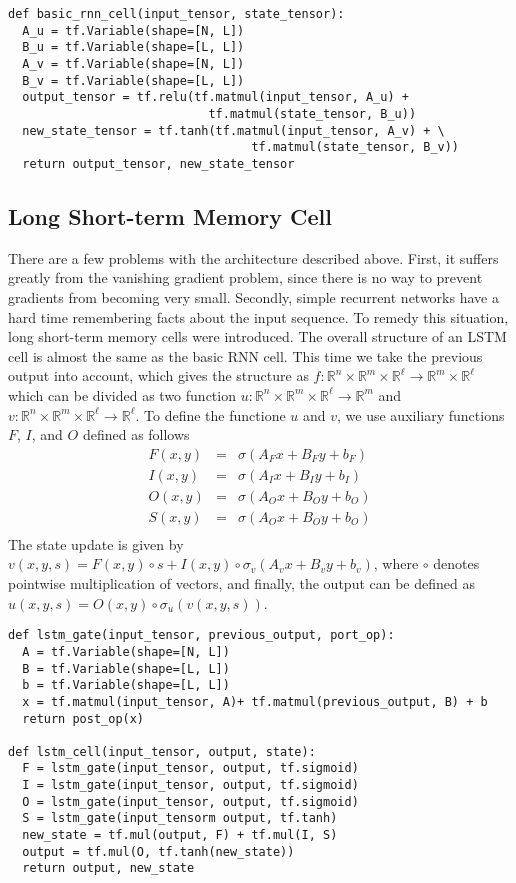\documentclass[10pt]{amsart}
\newcommand{\R}{\mathbb{R}}
\theoremstyle{definition}
\begin{document}
\begin{verbatim}
def basic_rnn_cell(input_tensor, state_tensor):
  A_u = tf.Variable(shape=[N, L])
  B_u = tf.Variable(shape=[L, L])
  A_v = tf.Variable(shape=[N, L])
  B_v = tf.Variable(shape=[L, L])
  output_tensor = tf.relu(tf.matmul(input_tensor, A_u) +
                            tf.matmul(state_tensor, B_u))
  new_state_tensor = tf.tanh(tf.matmul(input_tensor, A_v) + \
                                  tf.matmul(state_tensor, B_v))
  return output_tensor, new_state_tensor
\end{verbatim}


\subsection{Long Short-term Memory Cell} There are a few problems with the architecture described above.  First, it suffers greatly from the vanishing gradient problem, since there is no way to prevent gradients from becoming very small.  Secondly, simple recurrent networks have a hard time remembering facts about the input sequence.  To remedy this situation, long short-term memory cells were introduced.  The overall structure of an LSTM cell is almost the same as the basic RNN cell. This time we take the previous output into account, which gives the structure as $f:\R^n\times \R^m\times \R^{\ell}\to \R^m\times \R^{\ell}$ which can be divided as two function $u:\R^{n}\times\R^m\times \R^{\ell}\to \R^m$ and $v:\R^n\times \R^m\times\R^{\ell}\to \R^{\ell}$. To define the functione $u$ and $v$, we use auxiliary functions $F$, $I$, and $O$ defined as follows
\begin{eqnarray*}
  F(x, y) &=& \sigma(A_Fx + B_Fy + b_F)\\
  I(x, y) &=& \sigma(A_Ix + B_Iy + b_I)\\
  O(x, y) &=& \sigma(A_Ox + B_Oy + b_O)\\
  S(x, y) &=& \sigma(A_Ox + B_Oy + b_O)\\
\end{eqnarray*}
The state update is given by $v(x, y, s) = F(x, y)\circ s + I(x, y)\circ \sigma_v(A_vx + B_vy + b_v)$, where $\circ$ denotes pointwise multiplication of vectors, and finally, the output can be defined as $u(x, y, s)=O(x, y)\circ \sigma_u(v(x, y, s))$.

\begin{verbatim}
def lstm_gate(input_tensor, previous_output, port_op):
  A = tf.Variable(shape=[N, L])
  B = tf.Variable(shape=[L, L])
  b = tf.Variable(shape=[L, L])
  x = tf.matmul(input_tensor, A)+ tf.matmul(previous_output, B) + b
  return post_op(x)

def lstm_cell(input_tensor, output, state):
  F = lstm_gate(input_tensor, output, tf.sigmoid)
  I = lstm_gate(input_tensor, output, tf.sigmoid)
  O = lstm_gate(input_tensor, output, tf.sigmoid)
  S = lstm_gate(input_tensorm output, tf.tanh)
  new_state = tf.mul(output, F) + tf.mul(I, S)
  output = tf.mul(O, tf.tanh(new_state))
  return output, new_state
\end{verbatim}
\end{document}
